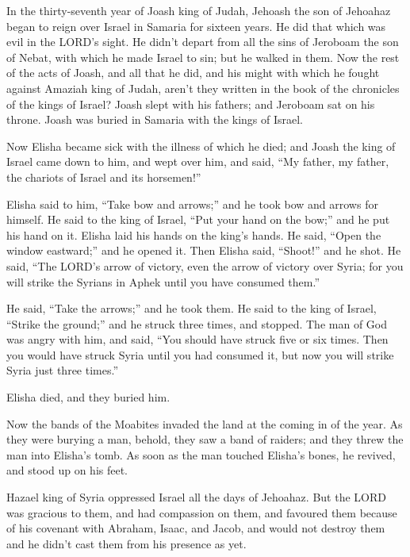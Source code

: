  In the thirty-seventh year of Joash king of Judah,
Jehoash the son of Jehoahaz began to reign over Israel in Samaria for
sixteen years.  He did that which was evil in the LORD's
sight. He didn't depart from all the sins of Jeroboam the son of Nebat,
with which he made Israel to sin; but he walked in them. 
Now the rest of the acts of Joash, and all that he did, and his might
with which he fought against Amaziah king of Judah, aren't they written
in the book of the chronicles of the kings of Israel? 
Joash slept with his fathers; and Jeroboam sat on his throne. Joash was
buried in Samaria with the kings of Israel.

 Now Elisha became sick with the illness of which he
died; and Joash the king of Israel came down to him, and wept over him,
and said, ``My father, my father, the chariots of Israel and its
horsemen!''

 Elisha said to him, ``Take bow and arrows;'' and he took
bow and arrows for himself.  He said to the king of
Israel, ``Put your hand on the bow;'' and he put his hand on it. Elisha
laid his hands on the king's hands.  He said, ``Open the
window eastward;'' and he opened it. Then Elisha said, ``Shoot!'' and he
shot. He said, ``The LORD's arrow of victory, even the arrow of victory
over Syria; for you will strike the Syrians in Aphek until you have
consumed them.''

 He said, ``Take the arrows;'' and he took them. He said
to the king of Israel, ``Strike the ground;'' and he struck three times,
and stopped.  The man of God was angry with him, and
said, ``You should have struck five or six times. Then you would have
struck Syria until you had consumed it, but now you will strike Syria
just three times.''

 Elisha died, and they buried him.

Now the bands of the Moabites invaded the land at the coming in of the
year.  As they were burying a man, behold, they saw a
band of raiders; and they threw the man into Elisha's tomb. As soon as
the man touched Elisha's bones, he revived, and stood up on his feet.

 Hazael king of Syria oppressed Israel all the days of
Jehoahaz.  But the LORD was gracious to them, and had
compassion on them, and favoured them because of his covenant with
Abraham, Isaac, and Jacob, and would not destroy them and he didn't cast
them from his presence as yet.

